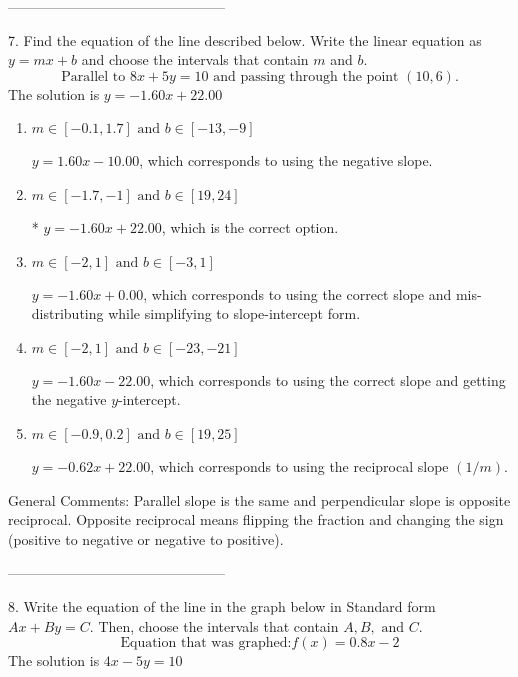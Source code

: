 \documentclass{article}[14pt]
\begin{document}
-----------------------------------------------

7. Find the equation of the line described below. Write the linear equation as $ y=mx+b $ and choose the intervals that contain $m$ and $b$.
$$ \text{Parallel to } 8 x + 5 y = 10 \text{ and passing through the point } (10, 6). $$ 
The solution is $ y = -1.60x + 22.00 $ 

\begin{enumerate}[label=\Alph*.] 
\item $ m \in [-0.1, 1.7] \text{ and } b \in [-13, -9] $ 

  $y = 1.60x - 10.00$, which corresponds to using the negative slope. 
\item $ m \in [-1.7, -1] \text{ and } b \in [19, 24] $ 

 * $y = -1.60x + 22.00$, which is the correct option. 
\item $ m \in [-2, 1] \text{ and } b \in [-3, 1] $ 

  $y = -1.60x + 0.00$, which corresponds to using the correct slope and mis-distributing while simplifying to slope-intercept form. 
\item $ m \in [-2, 1] \text{ and } b \in [-23, -21] $ 

  $y = -1.60x - 22.00$, which corresponds to using the correct slope and getting the negative $y$-intercept. 
\item $ m \in [-0.9, 0.2] \text{ and } b \in [19, 25] $ 

  $y = -0.62x + 22.00$, which corresponds to using the reciprocal slope $(1/m)$. 
\end{enumerate} 
 
General Comments: Parallel slope is the same and perpendicular slope is opposite reciprocal. Opposite reciprocal means flipping the fraction and changing the sign (positive to negative or negative to positive).

-----------------------------------------------

8. Write the equation of the line in the graph below in Standard form $Ax+By=C$. Then, choose the intervals that contain $A, B, \text{ and } C$.
$$ \text{Equation that was graphed:} f(x)= 0.8 x - 2 $$ 
The solution is $ 4 x - 5 y = 10 $ 
\end{document}
